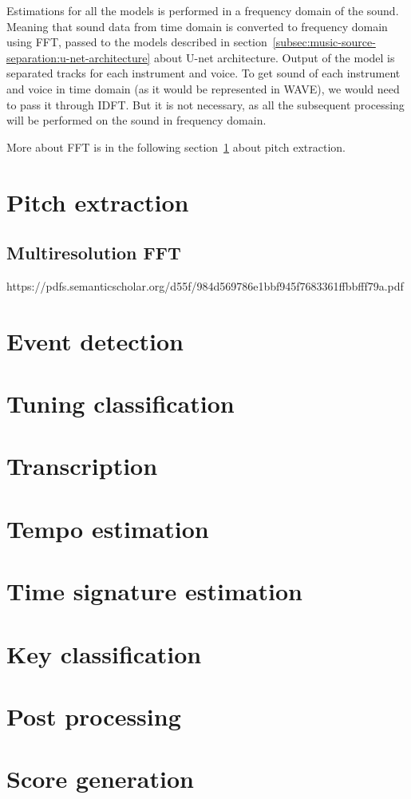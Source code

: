 Estimations for all the models is performed in a frequency domain of the sound. Meaning that sound data from time domain
is converted to frequency domain using \ac{FFT}, passed to the models described in section~\ref{subsec:music-source-separation:u-net-architecture}
about U-net architecture. Output of the model is separated tracks for each instrument and voice. To get sound of each
instrument and voice in time domain (as it would be represented in \ac{WAVE}), we would need to pass it through
\ac{IDFT}. But it is not necessary, as all the subsequent processing will be performed on the sound in frequency domain.

More about \ac{FFT} is in the following section~\ref{sec:pitch-extraction} about pitch extraction.

\section{Pitch extraction}\label{sec:pitch-extraction}

\subsection{Multiresolution \ac{FFT}}\label{subsec:multiresolution-fft}
https://pdfs.semanticscholar.org/d55f/984d569786e1bbf945f7683361ffbbfff79a.pdf

\section{Event detection}\label{sec:event-detection}

\section{Tuning classification}\label{sec:tunning-classification}

\section{Transcription}\label{sec:transcription}

\section{Tempo estimation}\label{sec:tempo-estimation}

\section{Time signature estimation}\label{sec:time-signature-estimation}

\section{Key classification}\label{sec:key-classification}

\section{Post processing}\label{sec:post-processing}

\section{Score generation}\label{sec:score-generation}



